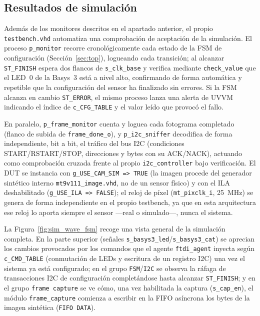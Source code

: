 \documentclass[../main.tex]{subfiles}
\begin{document}
\subsection{Resultados de simulación}
\label{subsec:resultados_simulacion}

Además de los monitores descritos en el apartado anterior, el propio \texttt{testbench.vhd} automatiza una comprobación de aceptación de la simulación. El proceso \texttt{p\_monitor} recorre cronológicamente cada estado de la \ac{FSM} de configuración (Sección~\ref{sec:top}), logueando cada transición; al alcanzar \texttt{ST\_FINISH} espera dos flancos de \texttt{s\_clk\_base} y verifica mediante \texttt{check\_value} que el LED~0 de la Basys~3 está a nivel alto, confirmando de forma automática y repetible que la configuración del sensor ha finalizado sin errores. Si la FSM alcanza en cambio \texttt{ST\_ERROR}, el mismo proceso lanza una alerta de UVVM indicando el índice de \texttt{c\_CFG\_TABLE} y el valor leído que provocó el fallo. 

En paralelo, \texttt{p\_frame\_monitor} cuenta y loguea cada fotograma completado (flanco de subida de \texttt{frame\_done\_o}), y \texttt{p\_i2c\_sniffer} decodifica de forma independiente, bit a bit, el tráfico del bus \ac{I2C} (condiciones START/RSTART/STOP, direcciones y bytes con su ACK/NACK), actuando como comprobación cruzada frente al propio \texttt{i2c\_controller} bajo verificación. El \ac{DUT} se instancia con \texttt{g\_USE\_CAM\_SIM => TRUE} (la imagen procede del generador sintético interno \texttt{mt9v111\_image.vhd}, no de un sensor físico) y con el \ac{ILA} deshabilitado (\texttt{g\_USE\_ILA => FALSE}); el reloj de píxel (\texttt{mt\_pixclk\_i}, 25~MHz) se genera de forma independiente en el propio testbench, ya que en esta arquitectura ese reloj lo aporta siempre el sensor —real o simulado—, nunca el sistema.

La Figura~\ref{fig:sim_wave_fsm} recoge una vista general de la simulación completa. En la parte superior (señales \texttt{s\_basys3\_led}/\texttt{s\_basys3\_cat}) se aprecian los cambios provocados por los comandos que el agente \texttt{ftdi\_agent} inyecta según \texttt{c\_CMD\_TABLE} (conmutación de LEDs y escritura de un registro \ac{I2C}) una vez el sistema ya está configurado; en el grupo \texttt{FSM}/\texttt{I2C} se observa la ráfaga de transacciones \ac{I2C} de configuración completándose hasta alcanzar \texttt{ST\_FINISH}; y en el grupo \texttt{frame capture} se ve cómo, una vez habilitada la captura (\texttt{s\_cap\_en}), el módulo \texttt{frame\_capture} comienza a escribir en la \ac{FIFO} asíncrona los bytes de la imagen sintética (\texttt{FIFO DATA}).
\end{document}
